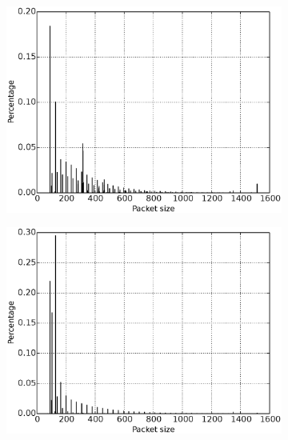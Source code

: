 \begin{figure}[h]
\centering
\begin{subfigure}{0.14\linewidth}
\centering
\includegraphics[width=\linewidth]{image/inv_pktsizes.eps}
\caption{}
\label{fig:inv_pktsizes}
\end{subfigure}
\begin{subfigure}{0.14\linewidth}
\centering
\includegraphics[width=\linewidth]{image/getdata_pktsizes.eps}
\caption{}
\label{fig:getdata_pktsizes}
\end{subfigure}
\begin{subfigure}{0.14\linewidth}
\centering

\end{subfigure}
\end{figure}
